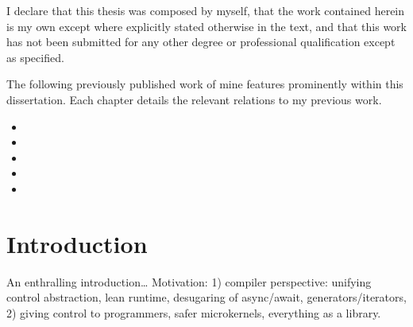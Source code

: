 \documentclass[12pt,phd,lfcs,twoside,openright,logo,leftchapter,normalheadings]{infthesis}
\theoremstyle{plain}
\theoremstyle{definition}
\begin{document}
\begin{preliminary}
\begin{declaration}
  I declare that this thesis was composed by myself, that the work
  contained herein is my own except where explicitly stated otherwise
  in the text, and that this work has not been submitted for any other
  degree or professional qualification except as specified.

  The following previously published work of mine features prominently
  within this dissertation.  Each chapter details the relevant
  relations to my previous work.
  \begin{itemize}
    \item {}
    \item {}
    \item {}
    \item {}
    \item {}
  \end{itemize}
\end{declaration}

\dedication{\emph{Bara du sätter gränserna}}


\setcounter{secnumdepth}{2} %
\setcounter{tocdepth}{1} %
\tableofcontents

\end{preliminary}


\chapter{Introduction}
\label{ch:introduction}
An enthralling introduction\dots
%
Motivation: 1) compiler perspective: unifying control abstraction,
lean runtime, desugaring of async/await, generators/iterators, 2)
giving control to programmers, safer microkernels, everything as a
library.
\end{document}
